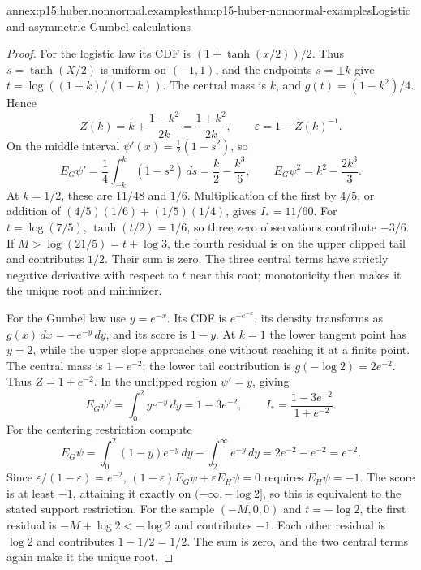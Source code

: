 \begin{annexitem}{annex:p15.huber.nonnormal.examples}{thm:p15-huber-nonnormal-examples}{Logistic and asymmetric Gumbel calculations}
\begin{proof}
For the logistic law its CDF is
\((1+\tanh(x/2))/2\). Thus \(s=\tanh(X/2)\) is uniform on \((-1,1)\),
and the endpoints \(s=\pm k\) give
\(t=\log((1+k)/(1-k))\). The central mass is \(k\),
and \(g(t)=(1-k^2)/4\). Hence
\[
 Z(k)=k+\frac{1-k^2}{2k}=\frac{1+k^2}{2k},
 \qquad \varepsilon=1-Z(k)^{-1}.
\]
On the middle interval
\(\psi'(x)=\frac12(1-s^2)\), so
\[
 E_G\psi'=\frac14\int_{-k}^k(1-s^2)\,ds
             =\frac k2-\frac{k^3}6,\qquad
 E_G\psi^2=k^2-\frac{2k^3}3 .
\]
At \(k=1/2\), these are \(11/48\) and \(1/6\).
Multiplication of the first by \(4/5\), or addition of
\((4/5)(1/6)+(1/5)(1/4)\), gives \(I_*=11/60\).
For \(t=\log(7/5)\),
\(\tanh(t/2)=1/6\), so three zero observations contribute
\(-3/6\). If \(M>\log(21/5)=t+\log3\), the fourth residual
is on the upper clipped tail and contributes \(1/2\).
Their sum is zero. The three central terms have strictly negative
derivative with respect to \(t\) near this root; monotonicity
then makes it the unique root and minimizer.

For the Gumbel law use \(y=e^{-x}\). Its CDF is
\(e^{-e^{-x}}\), its density transforms as
\(g(x)\,dx=-e^{-y}\,dy\), and its score is \(1-y\).
At \(k=1\) the lower tangent point has \(y=2\), while the upper
slope approaches one without reaching it at a finite point.
The central mass is \(1-e^{-2}\); the lower tail contribution
is \(g(-\log2)=2e^{-2}\). Thus \(Z=1+e^{-2}\).
In the unclipped region \(\psi'=y\), giving
\[
 E_G\psi'=\int_0^2 ye^{-y}\,dy=1-3e^{-2},
 \qquad I_*=\frac{1-3e^{-2}}{1+e^{-2}} .
\]
For the centering restriction compute
\[
 E_G\psi=\int_0^2(1-y)e^{-y}\,dy-\int_2^\infty e^{-y}\,dy
         =2e^{-2}-e^{-2}=e^{-2}.
\]
Since \(\varepsilon/(1-\varepsilon)=e^{-2}\),
\((1-\varepsilon)E_G\psi+\varepsilon E_H\psi=0\)
requires \(E_H\psi=-1\).
The score is at least \(-1\), attaining it exactly on
\((-\infty,-\log2]\), so this is equivalent to the stated support
restriction. For the sample \((-M,0,0)\) and \(t=-\log2\),
the first residual is \(-M+\log2<-\log2\) and contributes \(-1\).
Each other residual is \(\log2\) and contributes \(1-1/2=1/2\).
The sum is zero, and the two central terms again make it the
unique root.
\end{proof}
\end{annexitem}

